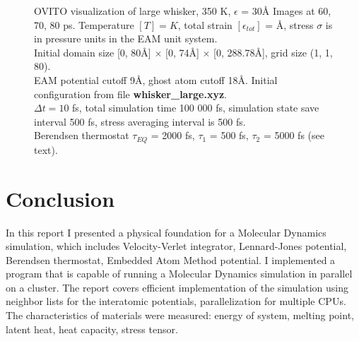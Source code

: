 \documentclass[12pt,a4paper]{article}
\begin{document}
\begin{figure}[h!]
\begin{minipage}{.3\textwidth}
	\end{minipage}
	\caption{OVITO visualization of large whisker, 350 K, $\epsilon$ = 30Å Images at 60, 70, 80 ps. Temperature $[T]=K$, total strain $[\epsilon_{tot}]$ = Å, stress $\sigma$ is in pressure units in the EAM unit system.\\
		Initial domain size [0, 80Å] $\times$ [0, 74Å] $\times$ [0, 288.78Å], grid size (1, 1, 80).\\
		EAM potential cutoff 9Å, ghost atom cutoff 18Å. Initial configuration from file {\bf whisker\_large.xyz}.\\
		$\Delta t = 10$ fs, total simulation time 100 000 fs, simulation state save interval 500 fs, stress averaging interval is 500 fs.\\
		Berendsen thermostat $\tau_{EQ}$ = 2000 fs, $\tau_1$ = 500 fs, $\tau_2$ = 5000 fs (see text).
	}
	\label{fig:whisker-large-defect}
\end{figure}

\clearpage

\section{Conclusion}
\label{conclusion}

In this report I presented a physical foundation for a Molecular Dynamics simulation, which includes Velocity-Verlet integrator, Lennard-Jones potential, Berendsen thermostat, Embedded Atom Method potential. I implemented a program that is capable of running a Molecular Dynamics simulation in parallel on a cluster. The report covers efficient implementation of the simulation using neighbor lists for the interatomic potentials, parallelization for multiple CPUs. The characteristics of materials were measured: energy of system, melting point, latent heat, heat capacity, stress tensor.

\newpage
{\small
	
	
}
\end{document}
